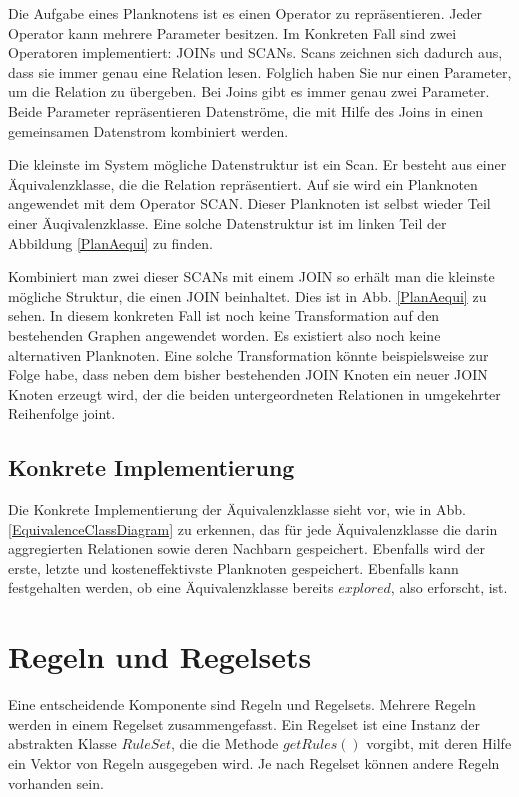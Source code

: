 Die Aufgabe eines Planknotens ist es einen Operator zu repräsentieren. Jeder Operator kann mehrere Parameter besitzen. Im Konkreten Fall sind zwei Operatoren implementiert: JOINs und SCANs. Scans zeichnen sich dadurch aus, dass sie immer genau eine Relation lesen. Folglich haben Sie nur einen Parameter, um die Relation zu übergeben. Bei Joins gibt es immer genau zwei Parameter. Beide Parameter repräsentieren Datenströme, die mit Hilfe des Joins in einen gemeinsamen Datenstrom kombiniert werden.

Die kleinste im System mögliche Datenstruktur ist ein Scan. Er besteht aus einer Äquivalenzklasse, die die Relation repräsentiert. Auf sie wird ein Planknoten angewendet mit dem Operator SCAN. Dieser Planknoten ist selbst wieder Teil einer Äuqivalenzklasse. Eine solche Datenstruktur ist im linken Teil der Abbildung \ref{PlanAequi} zu finden.

Kombiniert man zwei dieser SCANs mit einem JOIN so erhält man die kleinste mögliche Struktur, die einen JOIN beinhaltet. Dies ist in Abb. \ref{PlanAequi} zu sehen. In diesem konkreten Fall ist noch keine Transformation auf den bestehenden Graphen angewendet worden. Es existiert also noch keine alternativen Planknoten. Eine solche Transformation könnte beispielsweise zur Folge habe, dass neben dem bisher bestehenden JOIN Knoten ein neuer JOIN Knoten erzeugt wird, der die beiden untergeordneten Relationen in umgekehrter Reihenfolge joint.


\subsection{Konkrete Implementierung}

Die Konkrete Implementierung der Äquivalenzklasse sieht vor, wie in Abb. \ref{EquivalenceClassDiagram} zu erkennen, das für jede Äquivalenzklasse die darin aggregierten Relationen sowie deren Nachbarn gespeichert. Ebenfalls wird der erste, letzte und kosteneffektivste Planknoten gespeichert. Ebenfalls kann festgehalten werden, ob eine Äquivalenzklasse bereits $explored$, also erforscht, ist. 




\section{Regeln und Regelsets}


Eine entscheidende Komponente sind Regeln und Regelsets. Mehrere Regeln werden in einem Regelset zusammengefasst. Ein Regelset ist eine Instanz der abstrakten Klasse $RuleSet$, die die Methode $getRules()$ vorgibt, mit deren Hilfe ein Vektor von Regeln ausgegeben wird. Je nach Regelset können andere Regeln vorhanden sein.








